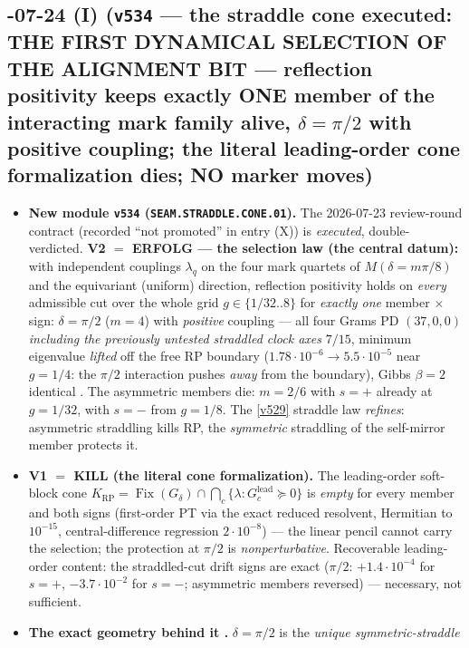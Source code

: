 \subsection*{-07-24 (I) (\texttt{v534} --- the straddle cone executed: THE FIRST DYNAMICAL SELECTION OF THE ALIGNMENT BIT --- reflection positivity keeps exactly ONE member of the interacting mark family alive, $\delta=\pi/2$ with positive coupling; the literal leading-order cone formalization dies; NO marker moves)}
\begin{itemize}[leftmargin=1.5em]
\item \textbf{New module \texttt{v534} (\texttt{SEAM.STRADDLE.CONE.01}).} The 2026-07-23 review-round
contract (recorded ``not promoted'' in entry (X)) is \emph{executed}, double-verdicted. \textbf{V2 $=$
ERFOLG --- the selection law (the central datum):} with independent couplings $\lambda_q$ on the four mark
quartets of $M(\delta=m\pi/8)$ and the equivariant (uniform) direction, reflection positivity holds on
\emph{every} admissible cut over the whole grid $g\in\{1/32..8\}$ for \emph{exactly one} member $\times$
sign: $\delta=\pi/2$ ($m=4$) with \emph{positive} coupling --- all four Grams PD $(37,0,0)$
\emph{including the previously untested straddled clock axes} $7/15$, minimum eigenvalue \emph{lifted} off
the free RP boundary ($1.78\cdot10^{-6}\to5.5\cdot10^{-5}$ near $g=1/4$: the $\pi/2$ interaction pushes
\emph{away} from the boundary), Gibbs $\beta=2$ identical \mE. The asymmetric members die: $m=2/6$ with
$s=+$ already at $g=1/32$, with $s=-$ from $g=1/8$. The \vref{v529} straddle law \emph{refines}:
asymmetric straddling kills RP, the \emph{symmetric} straddling of the self-mirror member protects it.
\item \textbf{V1 $=$ KILL (the literal cone formalization).} The leading-order soft-block cone
$K_{\mathrm{RP}}=\operatorname{Fix}(G_\delta)\cap\bigcap_c\{\lambda: G_c^{\mathrm{lead}}\succeq0\}$ is
\emph{empty} for every member and both signs (first-order PT via the exact reduced resolvent, Hermitian to
$10^{-15}$, central-difference regression $2\cdot10^{-8}$) --- the linear pencil cannot carry the
selection; the protection at $\pi/2$ is \emph{nonperturbative}. Recoverable leading-order content: the
straddled-cut drift signs are exact ($\pi/2$: $+1.4\cdot10^{-4}$ for $s=+$, $-3.7\cdot10^{-2}$ for $s=-$;
asymmetric members reversed) --- necessary, not sufficient.
\item \textbf{The exact geometry behind it \mE.} $\delta=\pi/2$ is the \emph{unique symmetric-straddle
}
\end{itemize}
